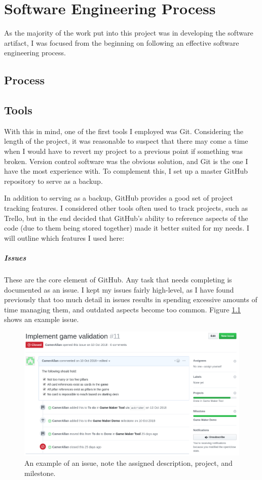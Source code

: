 \chapter{Software Engineering Process}

As the majority of the work put into this project was in developing the software artifact, I was focused from the beginning on following an effective software engineering process.

\section{Process}

\section{Tools}
With this in mind, one of the first tools I employed was Git\cite{Git}.
Considering the length of the project, it was reasonable to suspect that there may come a time when I would have to revert my project to a previous point if something was broken.
Version control software was the obvious solution, and Git is the one I have the most experience with. To complement this, I set up a master GitHub\cite{GitHub} repository to serve as a backup.

In addition to serving as a backup, GitHub provides a good set of project tracking features. 
I considered other tools often used to track projects, such as Trello\cite{Trello}, but in the end decided that GitHub's ability to reference aspects of the code (due to them being stored together) made it better suited for my needs. 
I will outline which features I used here:

\paragraph{Issues} These are the core element of GitHub. Any task that needs completing is documented as an issue.
I kept my issues fairly high-level, as I have found previously that too much detail in issues results in spending excessive amounts of time managing them, and outdated aspects become too common. Figure \ref{fig:issue} shows an example issue.

\begin{figure}[!h]
	\centering
	\includegraphics[width=1.0\textwidth]{./images/softeng/issue.png}
	\caption{An example of an issue, note the assigned description, project, and milestone.}
	\label{fig:issue}
\end{figure}

